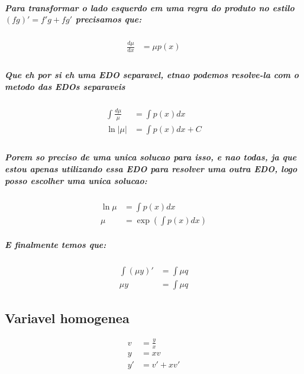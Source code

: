 \documentclass[12pt,twoside, a4paper, twocolumn]{article}
\newcommand\deriv[2]{\frac{\mathrm d #1}{\mathrm d #2}}
\begin{document}
\subparagraph*{Para transformar o lado esquerdo em uma regra do produto no estilo $(fg)' = f' g + fg'$ precisamos que:}

\begin{equation}
    \begin{aligned}
        \deriv{\mu}{x} & = \mu p(x) \\
    \end{aligned}
\end{equation}

\subparagraph*{Que eh por si eh uma EDO separavel, etnao podemos resolve-la com o metodo das EDOs separaveis }

\begin{equation}
    \begin{aligned}
        \int{\frac{d\mu}{\mu}} & = \int{p(x)dx}      \\
        \ln{|\mu|}             & = \int{p(x)dx}  + C \\
    \end{aligned}
\end{equation}

\subparagraph*{Porem so preciso de uma unica solucao para isso, e nao todas, ja que estou apenas utilizando essa EDO para resolver uma outra EDO, logo posso escolher uma unica solucao:}

\begin{equation}
    \begin{aligned}
        \ln{\mu} & = \int{p(x)dx}                    \\
        \mu      & = \exp{\left(\int{p(x)dx}\right)}
    \end{aligned}
\end{equation}

\subparagraph*{E finalmente temos que:}

\begin{equation}
    \begin{aligned}
        \int{(\mu y)'} & = \int{\mu q} \\
        \mu y          & = \int{\mu q}
    \end{aligned}
\end{equation}

\subsection{Variavel homogenea}

\begin{equation}
    \begin{aligned}
        v  & = \frac{y}{x} \\
        y  & = xv          \\
        y' & = v' + xv'    \\
    \end{aligned}
\end{equation}
\end{document}
